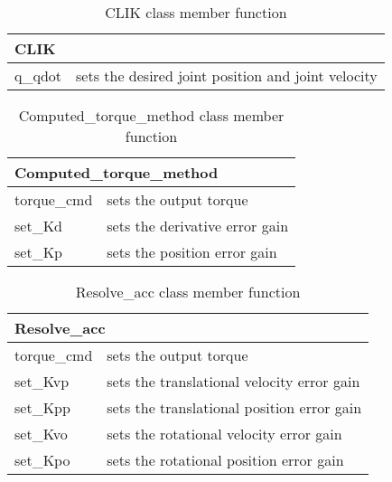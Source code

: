 \documentclass[dvips,11pt,fleqn]{report}
\begin{document}
\begin{table}[htbp]
\caption{CLIK class member function}
\label{tab:commandsum1e}
\begin{center}
\begin{tabular}{||l|l||}
\hline
\hline
\multicolumn{2}{||l||}{{\bf CLIK}} \\
\hline
\hline
q\_qdot & sets the desired joint position and joint velocity \\
\hline
\end{tabular}
\end{center}
\end{table}

\begin{table}[htbp]
\caption{Computed\_torque\_method class member function}
\label{tab:commandsum1f}
\begin{center}
\begin{tabular}{||l|l||}
\hline
\hline
\multicolumn{2}{||l||}{{\bf Computed\_torque\_method}} \\
\hline
\hline
torque\_cmd & sets the output torque \\
\hline
set\_Kd & sets the derivative error gain \\
\hline
set\_Kp & sets the position error gain \\
\hline
\end{tabular}
\end{center}
\end{table}

\begin{table}[htbp]
\caption{Resolve\_acc class member function}
\label{tab:commandsum1g}
\begin{center}
\begin{tabular}{||l|l||}
\hline
\hline
\multicolumn{2}{||l||}{{\bf Resolve\_acc}} \\
\hline
\hline
torque\_cmd & sets the output torque \\
\hline
set\_Kvp & sets the translational velocity error gain \\
\hline
set\_Kpp & sets the translational position error gain \\
\hline
set\_Kvo & sets the rotational velocity error gain \\
\hline
set\_Kpo & sets the rotational position error gain \\
\hline
\end{tabular}
\end{center}
\end{table}
\end{document}
